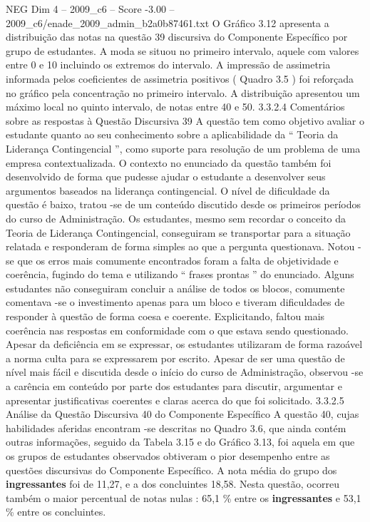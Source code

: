\begin{textsample}{NEG Dim 4 – 2009\_c6 – Score -3.00 – 2009\_c6/enade\_2009\_admin\_b2a0b87461.txt}
O Gráfico 3.12 apresenta a distribuição das notas na questão 39 discursiva do Componente Específico por grupo de estudantes.
A moda se situou no primeiro intervalo, aquele com valores entre 0 e 10 incluindo os extremos do intervalo.
A impressão de assimetria informada pelos coeficientes de assimetria positivos ( Quadro 3.5 ) foi reforçada no gráfico pela concentração no primeiro intervalo.
A distribuição apresentou um máximo local no quinto intervalo, de notas entre 40 e 50. 3.3.2.4 Comentários sobre as respostas à Questão Discursiva 39 A questão tem como objetivo avaliar o estudante quanto ao seu conhecimento sobre a aplicabilidade da “ Teoria da Liderança Contingencial ”, como suporte para resolução de um problema de uma empresa contextualizada.
O contexto no enunciado da questão também foi desenvolvido de forma que pudesse ajudar o estudante a desenvolver seus argumentos baseados na liderança contingencial.
O nível de dificuldade da questão é baixo, tratou -se de um conteúdo discutido desde os primeiros períodos do curso de Administração.
Os estudantes, mesmo sem recordar o conceito da Teoria de Liderança Contingencial, conseguiram se transportar para a situação relatada e responderam de forma simples ao que a pergunta questionava.
Notou -se que os erros mais comumente encontrados foram a falta de objetividade e coerência, fugindo do tema e utilizando “ frases prontas ” do enunciado.
Alguns estudantes não conseguiram concluir a análise de todos os blocos, comumente comentava -se o investimento apenas para um bloco e tiveram dificuldades de responder à questão de forma coesa e coerente.
Explicitando, faltou mais coerência nas respostas em conformidade com o que estava sendo questionado.
Apesar da deficiência em se expressar, os estudantes utilizaram de forma razoável a norma culta para se expressarem por escrito.
Apesar de ser uma questão de nível mais fácil e discutida desde o início do curso de Administração, observou -se a carência em conteúdo por parte dos estudantes para discutir, argumentar e apresentar justificativas coerentes e claras acerca do que foi solicitado. 3.3.2.5 Análise da Questão Discursiva 40 do Componente Específico A questão 40, cujas habilidades aferidas encontram -se descritas no Quadro 3.6, que ainda contém outras informações, seguido da Tabela 3.15 e do Gráfico 3.13, foi aquela em que os grupos de estudantes observados obtiveram o pior desempenho entre as questões discursivas do Componente Específico.
A nota média do grupo dos \textbf{ingressantes} foi de 11,27, e a dos concluintes 18,58.
Nesta questão, ocorreu também o maior percentual de notas nulas : 65,1 \% entre os \textbf{ingressantes} e 53,1 \% entre os concluintes.

\end{textsample}
